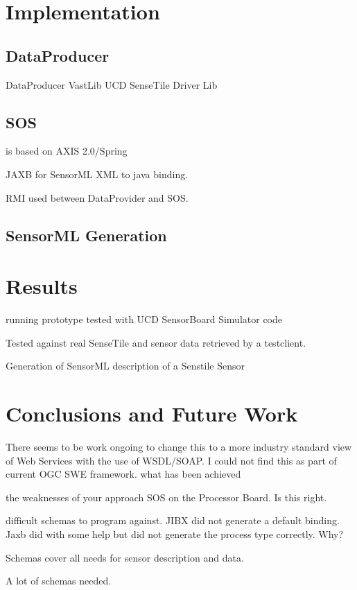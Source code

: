 \documentclass[]{final_report}
\begin{document}
\chapter{Implementation}

\section{DataProducer}

DataProducer VastLib UCD SenseTile Driver Lib

\section{SOS}
 is based on AXIS 2.0/Spring

JAXB for SensorML XML to java binding.

RMI used between DataProvider and SOS.

\section{SensorML Generation}

\chapter{Results}

running prototype tested with UCD SensorBoard Simulator code

Tested against real SenseTile and sensor data retrieved by a testclient.

Generation of SensorML description of a Senstile Sensor

\chapter{ Conclusions and Future Work}
There seems to be work ongoing to change this to a more industry standard view of Web Services with the use of WSDL/SOAP. I could not find this as part of current OGC SWE framework.
what has been achieved

the weaknesses of your approach
SOS on the Processor Board. Is this right.

difficult schemas to program against.
JIBX did not generate a default binding.
Jaxb did with some help but did not generate the process type correctly.
Why?

Schemas cover all needs for sensor description and data.

A lot of schemas needed.
\end{document}
